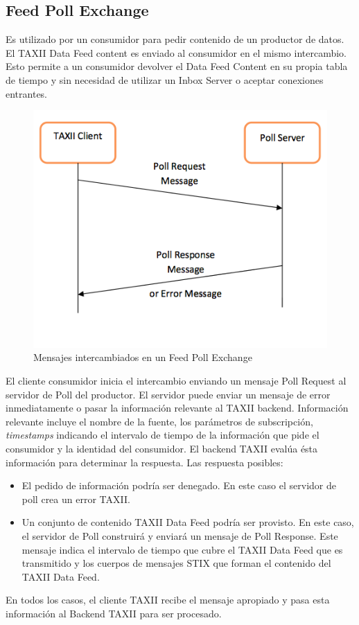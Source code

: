 \subsection{Feed Poll Exchange}

Es utilizado por un consumidor para pedir contenido de un productor de datos. El 
TAXII Data Feed content es enviado al consumidor en el mismo intercambio. Esto  
permite a un consumidor devolver el Data Feed Content en su propia tabla de 
tiempo y sin necesidad de utilizar un Inbox Server o aceptar conexiones 
entrantes.

\begin{figure}[ht!]
  \centering
    \includegraphics[width=150mm]{./images/FeedPollExchange.png}
    \caption{Mensajes intercambiados en un Feed Poll Exchange \protect\cite{b1}}
\end{figure}

El cliente consumidor inicia el intercambio enviando un mensaje Poll Request al 
servidor de Poll del productor. El servidor puede enviar un mensaje de error 
inmediatamente o pasar la información relevante al TAXII backend. Información 
relevante incluye el nombre de la fuente, los parámetros de subscripción, 
\textit{timestamps} indicando el intervalo de tiempo de la información que pide el 
consumidor y la identidad del consumidor. El backend TAXII evalúa ésta
información para determinar la respuesta. Las respuesta posibles:
\begin{itemize}
  \item El pedido de información podría ser denegado. En este caso el servidor 
  de poll crea un error TAXII. 
  \item Un conjunto de contenido TAXII Data Feed podría ser provisto. En este 
  caso, el servidor de Poll construirá y enviará un mensaje de Poll Response. 
  Este mensaje indica el intervalo de tiempo que cubre el TAXII Data Feed que es 
  transmitido y los cuerpos de mensajes STIX que forman el contenido del TAXII 
  Data Feed.
\end{itemize}
En todos los casos, el cliente TAXII recibe el mensaje apropiado y pasa esta 
información al Backend TAXII para ser procesado.

